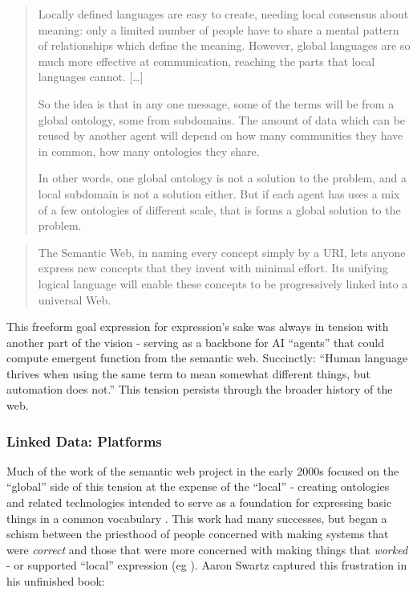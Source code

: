 \begin{quote}
Locally defined languages are easy to create, needing local consensus
about meaning: only a limited number of people have to share a mental
pattern of relationships which define the meaning. However, global
languages are so much more effective at communication, reaching the
parts that local languages cannot. {[}\ldots{]}

So the idea is that in any one message, some of the terms will be from a
global ontology, some from subdomains. The amount of data which can be
reused by another agent will depend on how many communities they have in
common, how many ontologies they share.

In other words, one global ontology is not a solution to the problem,
and a local subdomain is not a solution either. But if each agent has
uses a mix of a few ontologies of different scale, that is forms a
global solution to the problem. \cite{berners-leeScalefreeNatureWeb1998} 
\end{quote}

\begin{quote}
The Semantic Web, in naming every concept simply by a URI, lets anyone
express new concepts that they invent with minimal effort. Its unifying
logical language will enable these concepts to be progressively linked
into a universal Web. \cite{berners-leeSemanticWeb2001} 
\end{quote}

This freeform goal expression for expression's sake was always in
tension with another part of the vision - serving as a backbone for AI
``agents'' that could compute emergent function from the semantic web.
Succinctly: ``Human language thrives when using the same term to mean
somewhat different things, but automation does not.'' \cite{berners-leeSemanticWeb2001}  This tension persists through the
broader history of the web.

\hypertarget{linked-data-platforms}{%
\subsubsection{Linked Data: Platforms}\label{linked-data-platforms}}

Much of the work of the semantic web project in the early 2000s focused
on the ``global'' side of this tension at the expense of the ``local'' -
creating ontologies and related technologies intended to serve as a
foundation for expressing basic things in a common vocabulary \cite{hitzlerReviewSemanticWeb2021} . This work had many successes, but
began a schism between the priesthood of people concerned with making
systems that were \emph{correct} and those that were more concerned with
making things that \emph{worked} - or supported ``local'' expression (eg
\cite{palmerDitchingSemanticWeb2008} ). Aaron Swartz captured
this frustration in his unfinished book:

